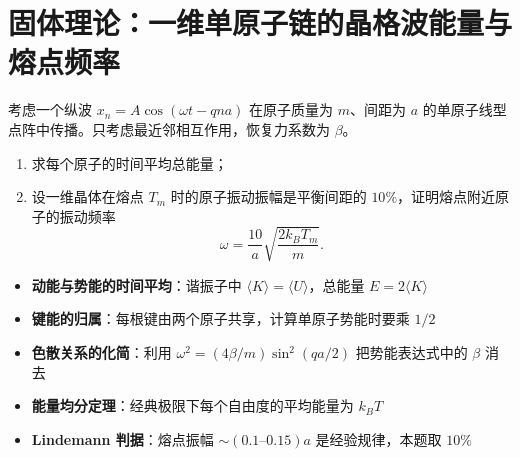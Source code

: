 \section{固体理论：一维单原子链的晶格波能量与熔点频率}
\label{sec:1d-chain-energy}

\begin{modelbox}[题目：晶格波的时间平均能量与熔点频率]
考虑一个纵波 $x_n=A\cos(\omega t-qna)$ 在原子质量为 $m$、间距为 $a$ 的单原子线型点阵中传播。只考虑最近邻相互作用，恢复力系数为 $\beta$。
\begin{enumerate}
    \item 求每个原子的时间平均总能量；
    \item 设一维晶体在熔点 $T_m$ 时的原子振动振幅是平衡间距的 $10\%$，证明熔点附近原子的振动频率
    \[
    \omega = \frac{10}{a}\sqrt{\frac{2k_BT_m}{m}}.
    \]
\end{enumerate}
\end{modelbox}

\begin{tipbox}[考点快速分析]
\begin{itemize}
    \item \textbf{动能与势能的时间平均}：谐振子中 $\langle K\rangle=\langle U\rangle$，总能量 $E=2\langle K\rangle$
    \item \textbf{键能的归属}：每根键由两个原子共享，计算单原子势能时要乘 $1/2$
    \item \textbf{色散关系的化简}：利用 $\omega^2=(4\beta/m)\sin^2(qa/2)$ 把势能表达式中的 $\beta$ 消去
    \item \textbf{能量均分定理}：经典极限下每个自由度的平均能量为 $k_BT$
    \item \textbf{Lindemann 判据}：熔点振幅 $\sim(0.1\text{--}0.15)a$ 是经验规律，本题取 $10\%$
\end{itemize}
\end{tipbox}

